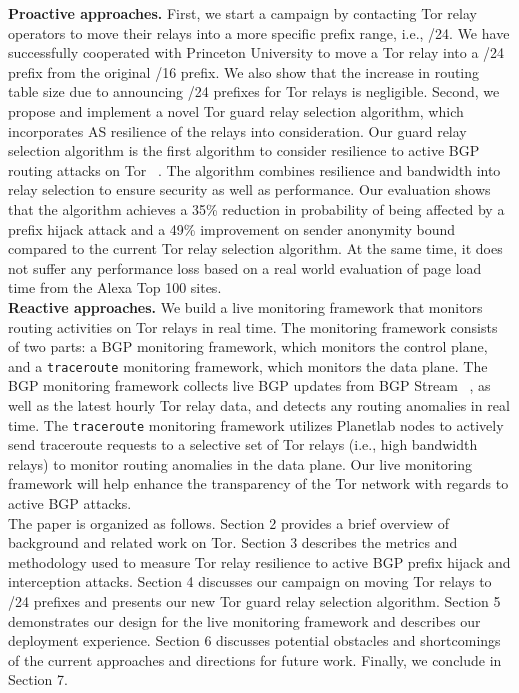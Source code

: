 \textbf{Proactive approaches.} First, we start a campaign by contacting Tor relay operators to move their relays into a more specific prefix range, i.e., /24. We have successfully cooperated with Princeton University to move a Tor relay into a /24 prefix from the original /16 prefix. We also show that the increase in routing table size due to announcing /24 prefixes for Tor relays is negligible. Second, we propose and implement a novel Tor guard relay selection algorithm, which incorporates AS resilience of the relays into consideration. Our guard relay selection algorithm is the first algorithm to consider resilience to active BGP routing attacks on Tor ~\cite{sun2015raptor}. The algorithm combines resilience and bandwidth into relay selection to ensure security as well as performance. Our evaluation shows that the algorithm achieves a 35\% reduction in probability of being affected by a prefix hijack attack and a 49\% improvement on sender anonymity bound compared to the current Tor relay selection algorithm. At the same time, it does not suffer any performance loss based on a real world evaluation of page load time from the Alexa Top 100 sites. 
\\
\textbf{Reactive approaches.} We build a live monitoring framework that monitors routing activities on Tor relays in real time. The monitoring framework consists of two parts: a BGP monitoring framework, which monitors the control plane, and a {\tt traceroute} monitoring framework, which monitors the data plane. The BGP monitoring framework collects live BGP updates from BGP Stream ~\cite{bgpstream}, as well as the latest hourly Tor relay data, and detects any routing anomalies in real time. The {\tt traceroute} monitoring framework utilizes Planetlab nodes to actively send traceroute requests to a selective set of Tor relays (i.e., high bandwidth relays) to monitor routing anomalies in the data plane. Our live monitoring framework will help enhance the transparency of the Tor network with regards to active BGP attacks.
\\
The paper is organized as follows. Section 2 provides a brief overview of background and related work on Tor.  Section 3 describes the metrics and methodology used to measure Tor relay resilience to active BGP prefix hijack and interception attacks. Section 4 discusses our campaign on moving Tor relays to /24 prefixes and presents our new Tor guard relay selection algorithm. Section 5 demonstrates our design for the live monitoring framework and describes our deployment experience. Section 6 discusses potential obstacles and shortcomings of the current approaches and directions for future work. Finally, we conclude in Section 7. 
